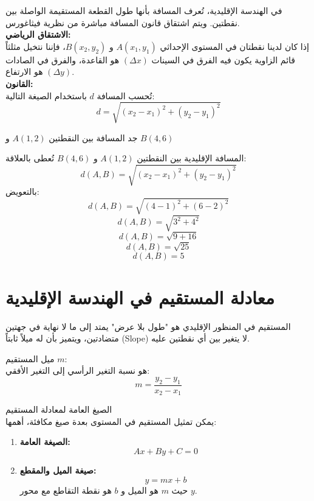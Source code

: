 في الهندسة الإقليدية، تُعرف المسافة بأنها طول القطعة المستقيمة الواصلة بين نقطتين. ويتم اشتقاق قانون المسافة مباشرة من نظرية فيثاغورس.\\
\textbf{الاشتقاق الرياضي:}\\
إذا كان لدينا نقطتان في المستوى الإحداثي $A(x_1, y_1)$ و $B(x_2, y_2)$، فإننا نتخيل مثلثاً قائم الزاوية يكون فيه الفرق في السينات $(\Delta x)$ هو القاعدة، والفرق في الصادات $(\Delta y)$ هو الارتفاع.\\
\textbf{القانون:}\\
تُحسب المسافة $d$ باستخدام الصيغة التالية:
\[
d = \sqrt{(x_2 - x_1)^2 + (y_2 - y_1)^2}
\]
\begin{example}
	جد المسافة بين النقطتين
	$A(1, 2)$ و $B(4, 6)$
\end{example}
\begin{solution}
	المسافة الإقليدية بين النقطتين $A(1,2)$ و $B(4,6)$ تُعطى بالعلاقة:
	\[
	d(A,B)=\sqrt{(x_2-x_1)^2+(y_2-y_1)^2}
	\]
	بالتعويض:
	\[
	d(A,B)=\sqrt{(4-1)^2+(6-2)^2}
	\]
	\[
	d(A,B)=\sqrt{3^2+4^2}
	\]
	\[
	d(A,B)=\sqrt{9+16}
	\]
	\[
	d(A,B)=\sqrt{25}
	\]
	\[
	d(A,B)=5
	\]
\end{solution}
\section[معادلة المستقيم في الهندسة الإقليدية]{معادلة المستقيم في الهندسة الإقليدية \cite{ref2}}
المستقيم في المنظور الإقليدي هو "طول بلا عرض" يمتد إلى ما لا نهاية في جهتين متضادتين، ويتميز بأن له ميلاً ثابتاً (Slope) لا يتغير بين أي نقطتين عليه.
\\\begin{tasks*}
	\item ميل المستقيم $m$:\\
	هو نسبة التغير الرأسي إلى التغير الأفقي:
	\[
	m = \frac{y_2 - y_1}{x_2 - x_1}
	\]
	\item الصيغ العامة لمعادلة المستقيم\\
		يمكن تمثيل المستقيم في المستوى بعدة صيغ مكافئة، أهمها:
	
	\begin{enumerate}
		\item \textbf{الصيغة العامة:}
		\[
		Ax + By + C = 0
		\]
		
		\item \textbf{صيغة الميل والمقطع:}
		\[
		y = mx + b
		\]
		حيث $m$ هو الميل و $b$ هو نقطة التقاطع مع محور $y$.
	\end{enumerate}
\end{tasks*}

